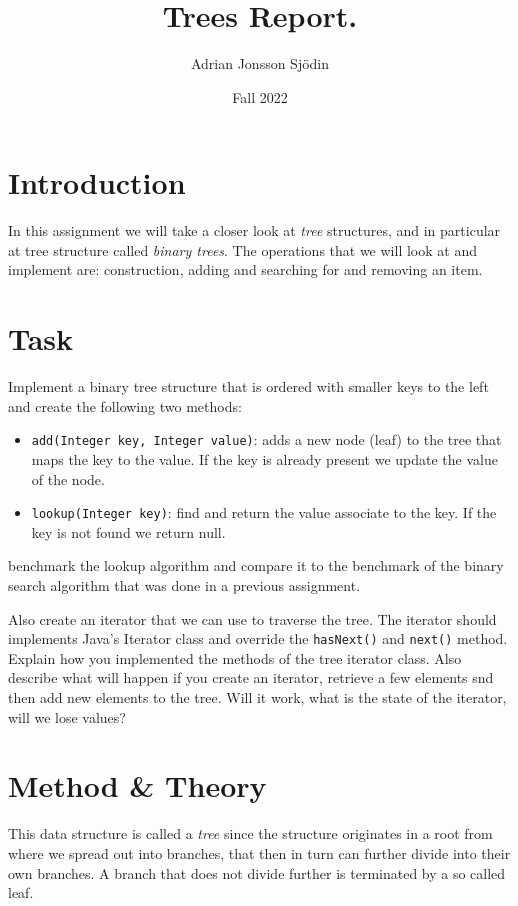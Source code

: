 \documentclass[a4paper,11pt]{article}
\begin{document}
\title{
    \textbf{Trees Report.}
}
\author{Adrian Jonsson Sjödin}
\date{Fall 2022}

\maketitle

\section*{Introduction}
In this assignment we will take a closer look at \textit{tree} structures, and in
particular at tree structure called \textit{binary trees}. The operations that we will look at and
implement are: construction, adding and searching for and removing an item.

\section*{Task}
Implement a binary tree structure that is ordered with smaller keys to the left and create the
following two methods:
\begin{itemize}
    \item {\tt add(Integer key, Integer value)}: adds a new node (leaf) to the
          tree that maps the key to the value. If the key is already present we
          update the value of the node.
    \item {\tt lookup(Integer key)}: find and return the value associate to the
          key. If the key is not found we return null.
\end{itemize}
benchmark the lookup algorithm and compare it to the benchmark of the binary search algorithm that
was done in a previous assignment.

Also create an iterator that we can use to traverse the tree. The iterator should implements Java's
Iterator class and override the {\tt hasNext()} and {\tt next()} method. Explain how you implemented
the methods of the tree iterator class. Also describe what will happen if you create an iterator,
retrieve a few elements snd then add new elements to the tree. Will it work, what is the state of the
iterator, will we lose values?

\section*{Method \& Theory}
This data structure is called a \textit{tree} since the structure originates in a root from where we
spread out into branches, that then in turn can further divide into their own branches. A branch that
does not divide further is terminated by a so called leaf.
\end{document}
